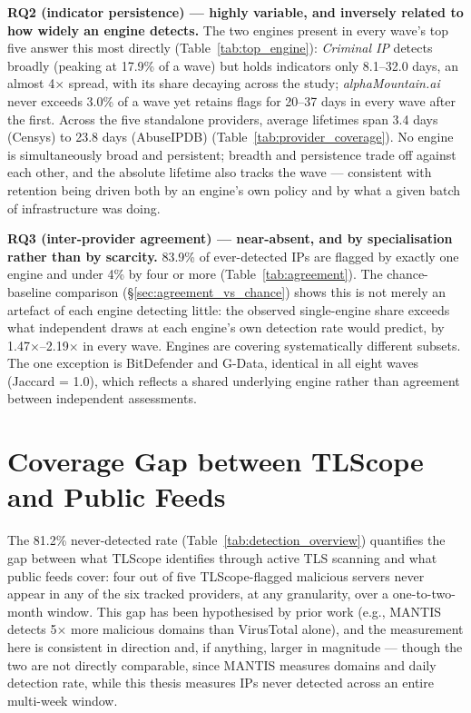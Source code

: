 \documentclass[12pt, a4paper, twoside]{report}
\begin{document}
\textbf{RQ2 (indicator persistence) --- highly variable, and inversely related to how widely an
engine detects.} The two engines present in every wave's top five answer this most directly
(Table~\ref{tab:top_engine}): \emph{Criminal IP} detects broadly (peaking at 17.9\% of a wave) but
holds indicators only 8.1--32.0 days, an almost 4$\times$ spread, with its share decaying across the
study; \emph{alphaMountain.ai} never exceeds 3.0\% of a wave yet retains flags for 20--37 days in
every wave after the first. Across the five standalone providers, average lifetimes span 3.4 days
(Censys) to 23.8 days (AbuseIPDB) (Table~\ref{tab:provider_coverage}). No engine is simultaneously
broad and persistent; breadth and persistence trade off against each other, and the absolute
lifetime also tracks the wave --- consistent with retention being driven both by an engine's own
policy and by what a given batch of infrastructure was doing.

\textbf{RQ3 (inter-provider agreement) --- near-absent, and by specialisation rather than by
scarcity.} 83.9\% of ever-detected IPs are flagged by exactly one engine and under 4\% by four or
more (Table~\ref{tab:agreement}). The chance-baseline comparison
(\S\ref{sec:agreement_vs_chance}) shows this is not merely an artefact of each engine detecting
little: the observed single-engine share exceeds what independent draws at each engine's own
detection rate would predict, by 1.47$\times$--2.19$\times$ in every wave. Engines are covering
systematically different subsets. The one exception is BitDefender and G-Data, identical in all
eight waves (Jaccard = 1.0), which reflects a shared underlying engine rather than agreement
between independent assessments.

\section{Coverage Gap between TLScope and Public Feeds}

The 81.2\% never-detected rate (Table~\ref{tab:detection_overview}) quantifies the gap between
what TLScope identifies through active TLS scanning and what public feeds cover: four out of five
TLScope-flagged malicious servers never appear in any of the six tracked providers, at any
granularity, over a one-to-two-month window. This gap has been hypothesised by prior work (e.g.,
MANTIS \cite{deniz2025mantis} detects 5$\times$ more malicious domains than VirusTotal alone), and
the measurement here is consistent in direction and, if anything, larger in magnitude --- though
the two are not directly comparable, since MANTIS measures domains and daily detection rate,
while this thesis measures IPs never detected across an entire multi-week window.
\end{document}
